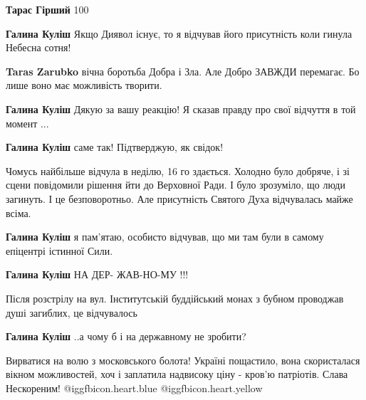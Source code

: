 \begin{itemize}
\begin{itemize}
\textbf{Тарас Гірший} 100%

\textbf{Галина Куліш} Якщо Диявол існує, то я відчував його присутність коли гинула Небесна сотня!

\textbf{Taras Zarubko} вічна боротьба Добра і Зла. Але Добро ЗАВЖДИ перемагає. Бо лише воно має можливість творити.

\textbf{Галина Куліш} Дякую за вашу реакцію! Я сказав правду про свої відчуття в той момент ...

\textbf{Галина Куліш} саме так! Підтверджую, як свідок!

\begin{itemize} %
Чомусь найбільше відчула в неділю, 16 го здається. Холодно було добряче, і зі сцени повідомили рішення йти до Верховної Ради. І було зрозуміло, що люди загинуть. І це безповоротньо. Але присутність Святого Духа відчувалась майже всіма.
\end{itemize} %

\textbf{Галина Куліш} я пам’ятаю, особисто відчував, що ми там були в самому епіцентрі істинної Сили.

\textbf{Галина Куліш} НА ДЕР- ЖАВ-НО-МУ !!!

Після розстрілу на вул. Інститутській буддійський монах з бубном проводжав душі
загиблих, це відчувалось

\textbf{Галина Куліш} ..а чому б і на державному не зробити?

\end{itemize} %


Вирватися на волю з московського болота! Україні пощастило, вона скористалася
вікном можливостей, хоч і заплатила надвисоку ціну - кров'ю патріотів. Слава
Нескореним! @igg{fbicon.heart.blue}  @igg{fbicon.heart.yellow} 

\end{itemize} %
